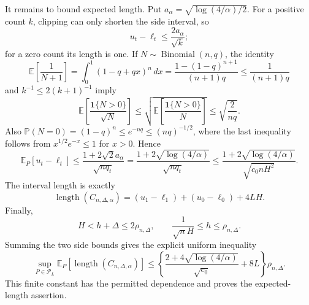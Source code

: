It remains to bound expected length.  Put \(a_\alpha=\sqrt{\log(4/\alpha)/2}\).  For a positive count \(k\), clipping can only shorten the side interval, so
\[
 u_t-\ell_t\leq\frac{2a_\alpha}{\sqrt k};
\]
for a zero count its length is one.  If \(N\sim\operatorname{Binomial}(n,q)\), the identity
\[
 \mathbb E\!\left[\frac1{N+1}\right]
 =\int_0^1(1-q+qx)^n\,dx
 =\frac{1-(1-q)^{n+1}}{(n+1)q}
 \leq\frac1{(n+1)q}
\]
and \(k^{-1}\leq2(k+1)^{-1}\) imply
\[
 \mathbb E\!\left[\frac{\mathbf1\{N>0\}}{\sqrt N}\right]
 \leq\sqrt{\mathbb E\!\left[\frac{\mathbf1\{N>0\}}N\right]}
 \leq\sqrt{\frac2{nq}}.
\]
Also \(\mathbb P(N=0)=(1-q)^n\leq e^{-nq}\leq(nq)^{-1/2}\), where the last inequality follows from \(x^{1/2}e^{-x}\leq1\) for \(x>0\).  Hence
\[
 \mathbb E_P[u_t-\ell_t]
 \leq\frac{1+2\sqrt2a_\alpha}{\sqrt{nq_t}}
 =\frac{1+2\sqrt{\log(4/\alpha)}}{\sqrt{nq_t}}
 \leq\frac{1+2\sqrt{\log(4/\alpha)}}{\sqrt{c_0nH^2}}.
\]
The interval length is exactly
\[
 \operatorname{length}(C_{n,\Delta,\alpha})
 =(u_1-\ell_1)+(u_0-\ell_0)+4LH.
\]
Finally,
\[
 H<h+\Delta\leq2\rho_{n,\Delta},
 \qquad
 \frac1{\sqrt nH}\leq h\leq\rho_{n,\Delta}.
\]
Summing the two side bounds gives the explicit uniform inequality
\[
 \sup_{P\in\mathcal P_L}\mathbb E_P[\operatorname{length}(C_{n,\Delta,\alpha})]
 \leq
 \left\{
 \frac{2+4\sqrt{\log(4/\alpha)}}{\sqrt{c_0}}+8L
 \right\}\rho_{n,\Delta}.
\]
This finite constant has the permitted dependence and proves the expected-length assertion.